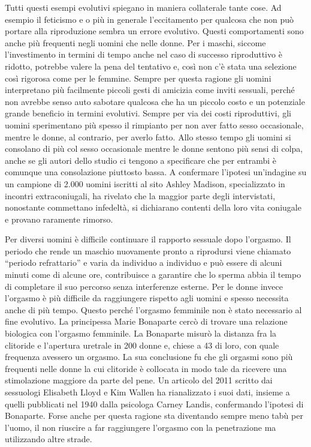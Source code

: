 \documentclass[12pt]{book} %
\begin{document}
Tutti questi esempi evolutivi spiegano in maniera collaterale tante cose. Ad esempio il feticismo e o più in generale
l'eccitamento per qualcosa che non può portare alla riproduzione sembra un errore evolutivo.
Questi comportamenti sono anche più frequenti negli uomini che nelle donne. Per i maschi, siccome
l'investimento in termini di tempo anche nel caso di successo riproduttivo è ridotto, potrebbe valere la pena
del tentativo e, così non c'è stata una selezione così rigorosa come per le femmine. Sempre per
questa ragione gli uomini interpretano più facilmente piccoli gesti di amicizia come inviti sessuali, perché non
avrebbe senso auto sabotare qualcosa che ha un piccolo costo e un potenziale grande beneficio in termini evolutivi.
Sempre per via dei costi riproduttivi, gli uomini sperimentano più spesso il rimpianto per non aver fatto sesso
occasionale, mentre le donne, al contrario, per averlo
fatto.
Allo stesso tempo gli uomini si consolano di più col sesso occasionale mentre le donne sentono più sensi di colpa, anche se gli autori dello studio ci tengono a specificare che per entrambi è comunque una consolazione piuttosto bassa. A confermare l'ipotesi un'indagine su un campione di 2.000 uomini iscritti al sito Ashley Madison, specializzato in incontri extraconiugali, ha rivelato che la maggior parte degli intervistati, nonostante commettano infedeltà, si dichiarano contenti della loro vita coniugale e provano raramente rimorso. 

Per diversi uomini è difficile continuare il rapporto sessuale dopo l'orgasmo. Il periodo che rende
un maschio nuovamente pronto a riprodursi viene chiamato “periodo refrattario” e varia da individuo a individuo e può
essere di alcuni minuti come di alcune ore, contribuisce a garantire che lo sperma abbia il tempo di completare il suo
percorso senza interferenze esterne. Per le donne invece l'orgasmo è più difficile da raggiungere
rispetto agli uomini e spesso necessita anche di più tempo. Questo perché l'orgasmo femminile non
è stato necessario al fine evolutivo. La principessa Marie Bonaparte cercò di trovare una relazione biologica con
l'orgasmo femminile. La Bonaparte misurò la distanza fra la clitoride e
l'apertura uretrale in 200 donne e, chiese a 43 di loro, con quale frequenza avessero un orgasmo.
La sua conclusione fu che gli orgasmi sono più frequenti nelle donne la cui clitoride è collocata in modo tale da
ricevere una stimolazione maggiore da parte del pene. Un articolo del 2011 scritto dai sessuologi Elisabeth Lloyd e Kim
Wallen ha rianalizzato i suoi dati, insieme a quelli pubblicati nel 1940 dalla psicologa Carney Landis, confermando
l'ipotesi di Bonaparte. Forse anche per questa ragione sta diventando sempre meno tabù per
l'uomo, il non riuscire a far raggiungere l'orgasmo con la penetrazione ma
utilizzando altre strade.
\end{document}
